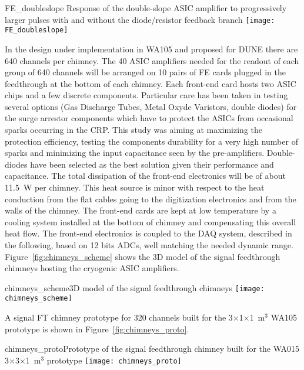 \begin{cdrfigure}{FE_doubleslope}
{Response of the double-slope ASIC amplifier to progressively larger 
pulses with and without the diode/resistor feedback branch}
\texttt{[image: FE\_doubleslope]}
\end{cdrfigure}

In the design under implementation in WA105 and proposed for DUNE there are 640 channels per chimney. The 40 ASIC amplifiers needed for
the readout of each group of 640 channels will be arranged on 10 pairs of FE cards plugged in the feedthrough at the bottom of each chimney.
Each front-end card hosts two ASIC chips and a few discrete components. Particular care has been taken in testing several options
(Gas Discharge Tubes, Metal Oxyde Varistors, double diodes) for the surge arrestor components which have to protect the ASICs from
occasional sparks occurring in the CRP.  This study was aiming at maximizing the protection efficiency, testing the components
durability for a very high number of sparks and minimizing the input capacitance seen by the pre-amplifiers. Double-diodes have been
selected as the best solution given their performance and capacitance. The total dissipation of the front-end electronics will
be of about 11.5~W per chimney. This heat source is minor with respect to the heat conduction from the flat cables going to the digitization
electronics and from the walls of the chimney. The front-end cards are kept at low temperature by a cooling system installed at the bottom of
chimney and compensating this overall heat flow. The front-end electronics is coupled to the DAQ system, described in the following,
based on 12 bits ADCs, well matching the needed dynamic range. Figure~\ref{fig:chimneys_scheme} shows the 3D model of the signal
feedthrough chimneys hosting the cryogenic ASIC amplifiers.

\begin{cdrfigure}
{chimneys_scheme}{3D model of the signal feedthrough chimneys}
\texttt{[image: chimneys\_scheme]}
\end{cdrfigure}

A signal FT chimney prototype for 320 channels built for the 3$\times$1$\times$1~m$^3$ WA105 prototype is shown in
Figure~\ref{fig:chimneys_proto}.

\begin{cdrfigure}
{chimneys_proto}{Prototype of the signal feedthrough chimney built 
for the WA015 3$\times$3$\times$1~m$^3$ prototype}
\texttt{[image: chimneys\_proto]}
\end{cdrfigure}

